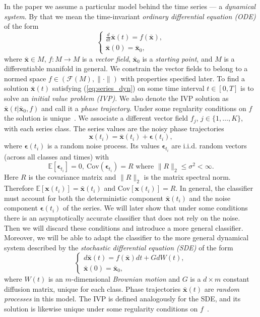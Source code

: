 \documentclass[referee, pdflatex, sn-mathphys-num]{sn-jnl}
\theoremstyle{definition}
\theoremstyle{plain}
\newcommand{\bx}{\ensuremath{\mathbf{x}}}
\newcommand{\bbx}{\ensuremath{\bar{\mathbf{x}}}}
\newcommand{\beps}{\ensuremath{\boldsymbol{\epsilon}}}
\begin{document}
	In the paper we assume a particular model behind the time series --- a \emph{dynamical system}. By that we mean the time-invariant \emph{ordinary differential equation (ODE)} of the form
	\begin{equation}\label{eq:series_dyn}
		\begin{cases}
			\frac{d}{dt} \bbx(t) = f(\bbx), \\
			\bbx(0) = \bbx_0,
		\end{cases}
	\end{equation}
	where $\bbx \in M$, $f: M \to M$ is a \textit{vector field}, $\bbx_0$ is a \textit{starting point}, and $M$ is a differentiable manifold in general. We constrain the vector fields to belong to a normed space $f \in (\mathcal{F}(M), \lVert \cdot \rVert)$ with properties specified later. To find a solution $\bbx(t)$ satisfying (\ref{eq:series_dyn}) on some time interval $t \in [0, T]$ is to solve an \emph{initial value problem (IVP)}. We also denote the IVP solution as $\bbx(t | \bbx_0, f)$ and call it a \textit{phase trajectory}. Under some regularity conditions on $f$ the solution is unique~\cite{Wiggins2003}. We associate a different vector field $f_j$, $j \in \{1, \ldots, K\}$, with each series class. The series values are the noisy phase trajectories
	\begin{equation}\label{eq:series_def}
		\bx(t_i) = \bbx(t_i) + \beps(t_i),
	\end{equation}
	where $\beps(t_i)$ is a random noise process. Its values $\beps_{t_i}$ are i.i.d. random vectors (across all classes and times) with
	\begin{equation}\label{eq:noise_conditions}
		\mathbb{E}[\beps_{t_i}] = 0, \  \text{Cov}(\beps_{t_i}) = R \text{ where } \lVert R \rVert_2 \le \sigma^2 < \infty.
	\end{equation}
	Here $R$ is the covariance matrix and $ \lVert R \rVert_2$ is the matrix spectral norm. Therefore $\mathbb{E}[\bx(t_i)] = \bbx(t_i)$ and $\text{Cov}[\bx(t_i)] = R$. In general, the classifier must account for both the deterministic component $\bbx(t_i)$ and the noise component $\beps(t_i)$ of the series. We will later show that under some conditions there is an asymptotically accurate classifier that does not rely on the noise. Then we will discard these conditions and introduce a more general classifier. Moreover, we will be able to adapt the classifier to the more general dynamical system described by the \emph{stochastic differential equation (SDE)} \cite{oksendal_sde} of the form
	\begin{equation}\label{eq:series_sde_dyn}
		\begin{cases}
			d\bbx(t) = f(\bbx)dt + G dW(t), \\
			\bbx(0) = \bbx_0,
		\end{cases}
	\end{equation}
	where $W(t)$ is an $m$-dimensional \emph{Brownian motion} and $G$ is a $d \times m$ constant diffusion matrix, unique for each class. Phase trajectories $\bbx(t)$ are \emph{random processes} in this model. The IVP is defined analogously for the SDE, and its solution is likewise unique under some regularity conditions on $f$~\cite{oksendal_sde}.
	
\end{document}
